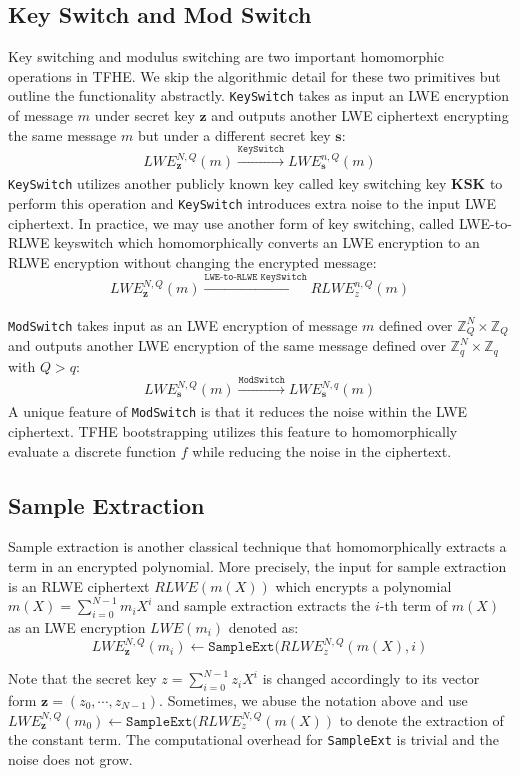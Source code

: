 \documentclass{iacrtrans}
\theoremstyle{plain}
\begin{document}
\subsection{Key Switch and Mod Switch}
Key switching and modulus switching are two important homomorphic operations in TFHE. 
We skip the algorithmic detail for these two primitives but outline the functionality abstractly. \texttt{KeySwitch} takes as input an LWE encryption of message $m$ under secret key $\mathbf{z}$ and outputs another LWE ciphertext encrypting the same message $m$ but under a different secret key $\mathbf{s}$:
\[
LWE_{\mathbf{z}}^{N,Q}(m)\xrightarrow[]{\texttt{KeySwitch}}LWE_{\mathbf{s}}^{n,Q}(m)
\]
\texttt{KeySwitch} utilizes another publicly known key called key switching key $\mathbf{KSK}$ to perform this operation and \texttt{KeySwitch} introduces extra noise to the input LWE ciphertext. In practice, we may use another form of key switching, called LWE-to-RLWE keyswitch which homomorphically converts an LWE encryption to an RLWE encryption without changing the encrypted message:
\[
LWE_{\mathbf{z}}^{N,Q}(m)\xrightarrow[]{\texttt{LWE-to-RLWE KeySwitch}}RLWE_{z}^{n,Q}(m)
\]


\texttt{ModSwitch} takes input as an LWE encryption of message $m$ defined over $\mathbb{Z}_Q^N\times\mathbb{Z}_Q$ and outputs another LWE encryption of the same message defined over $\mathbb{Z}_q^N\times\mathbb{Z}_q$ with $Q>q$:
\[
LWE_{\mathbf{s}}^{N,Q}(m)\xrightarrow[]{\texttt{ModSwitch}}LWE_{\mathbf{s}}^{N,q}(m)
\]
A unique feature of \texttt{ModSwitch} is that it reduces the noise within the LWE ciphertext. TFHE bootstrapping utilizes this feature to homomorphically evaluate a discrete function $f$ while reducing the noise in the ciphertext.

\subsection{Sample Extraction}
Sample extraction is another classical technique that homomorphically extracts a term in an encrypted polynomial. More precisely, the input for sample extraction is an RLWE ciphertext $RLWE(m(X))$ which encrypts a polynomial $m(X)=\sum_{i=0}^{N-1}m_iX^i$ and sample extraction extracts the $i$-th term of $m(X)$ as an LWE encryption $LWE(m_i)$ denoted as:
\[
LWE_{\mathbf{z}}^{N,Q}(m_i) \gets \texttt{SampleExt}(RLWE_{z}^{N,Q}(m(X),i)
\]

Note that the secret key $z=\sum_{i=0}^{N-1}z_iX^i$ is changed accordingly to its vector form $\mathbf{z}=(z_0,\cdots,z_{N-1})$.
Sometimes, we abuse the notation above and use $LWE_{\mathbf{z}}^{N,Q}(m_0) \gets \texttt{SampleExt}(RLWE_{z}^{N,Q}(m(X))$ to denote the extraction of the constant term. 
The computational overhead for \texttt{SampleExt} is trivial and the noise does not grow.
\end{document}
